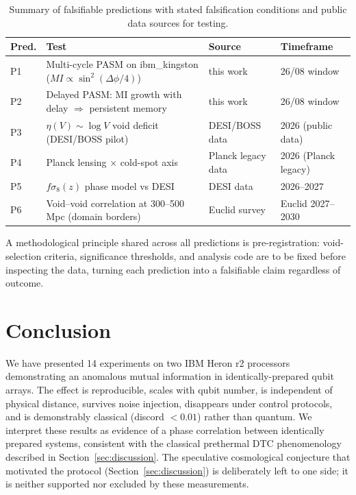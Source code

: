 \documentclass[12pt,a4paper]{article}
\begin{document}
\begin{table}[h]
\centering
\small
\begin{tabular}{p{}p{}p{}p{}}
\toprule
\textbf{Pred.} & \textbf{Test} & \textbf{Source} & \textbf{Timeframe} \\
\midrule
P1 & Multi-cycle PASM on ibm\_kingston ($MI \propto \sin^2(\Delta\phi/4)$) & this work & 26/08 window \\
P2 & Delayed PASM: MI growth with delay $\Rightarrow$ persistent memory & this work & 26/08 window \\
P3 & $\eta(V) \sim \log V$ void deficit (DESI/BOSS pilot) & DESI/BOSS data & 2026 (public data) \\
P4 & Planck lensing $\times$ cold-spot axis & Planck legacy data & 2026 (Planck legacy) \\
P5 & $f\sigma_8(z)$ phase model vs DESI & DESI data & 2026--2027 \\
P6 & Void--void correlation at 300--500 Mpc (domain borders) & Euclid survey & Euclid 2027--2030 \\
\bottomrule
\end{tabular}
\caption{Summary of falsifiable predictions with stated falsification conditions and public data sources for testing.}
\label{tab:predictions}
\end{table}

A methodological principle shared across all predictions is pre-registration: void-selection criteria, significance thresholds, and analysis code are to be fixed before inspecting the data, turning each prediction into a falsifiable claim regardless of outcome.

\section{Conclusion}
\label{sec:conclusion}

We have presented 14 experiments on two IBM Heron r2 processors demonstrating an anomalous mutual information in identically-prepared qubit arrays. The effect is reproducible, scales with qubit number, is independent of physical distance, survives noise injection, disappears under control protocols, and is demonstrably classical (discord $< 0.01$) rather than quantum. We interpret these results as evidence of a phase correlation between identically prepared systems, consistent with the classical prethermal DTC phenomenology described in Section~\ref{sec:discussion}. The speculative cosmological conjecture that motivated the protocol (Section~\ref{sec:discussion}) is deliberately left to one side; it is neither supported nor excluded by these measurements.
\end{document}
